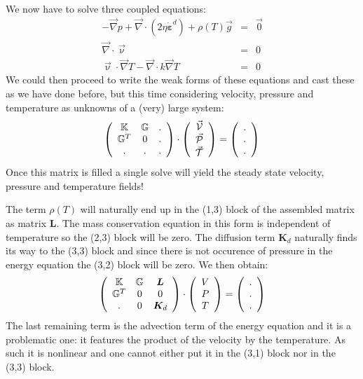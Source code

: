We now have to solve three coupled equations:
\begin{eqnarray}
-{\vec \nabla}p + {\vec \nabla}\cdot (2 \eta \dot{\bm \varepsilon}^d ) + \rho(T) {\vec g} &=& \vec{0} \\
{\vec \nabla}\cdot{\vec \upnu} &=& 0 \\ 
\vec{\upnu}\cdot\vec\nabla T - {\vec \nabla} \cdot k {\vec \nabla} T &=& 0 
\end{eqnarray}
We could then proceed to write the weak forms of these equations and cast these as we have done before, 
but this time considering velocity, pressure and temperature as unknowns of a (very) large system:
\[
\left(
\begin{array}{ccc}
{\mathbb{K}} & {\mathbb{G}} & . \\
{\mathbb{G}}^T & 0 & . \\
. & . & . 
\end{array}
\right)
\cdot
\left(
\begin{array}{c}
\vec{\cal V} \\ \vec{\cal P} \\ \vec{\cal T}
\end{array}
\right)
=
\left(
\begin{array}{c}
. \\ . \\ .
\end{array}
\right)
\]
Once this matrix is filled a single solve will yield the steady state velocity, pressure and 
temperature fields! 

The term $\rho(T)$ will naturally end up in the (1,3) block of the assembled matrix as matrix ${\bm L}$.
The mass conservation equation in this form is independent of temperature so the (2,3) block 
will be zero. The diffusion term ${\bm K}_d$ naturally finds its way to the (3,3) 
block and since there is not occurence of pressure in the energy equation the (3,2) 
block will be zero. We then obtain:
\[
\left(
\begin{array}{ccc}
{\mathbb{K}} & {\mathbb{G}} & {\bm L} \\
{\mathbb{G}}^T & 0 & 0 \\
. & 0 & {\bm K}_d 
\end{array}
\right)
\cdot
\left(
\begin{array}{c}
V \\ P \\ T 
\end{array}
\right)
=
\left(
\begin{array}{c}
. \\ . \\ .
\end{array}
\right)
\]
The last remaining term is the advection term of the energy equation and it is a problematic one:
it features the product of the velocity by the temperature. As such it is nonlinear and one cannot 
either put it in the (3,1) block nor in the (3,3) block. 

